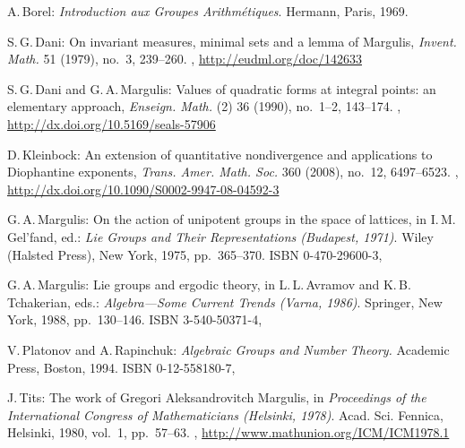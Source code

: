 \begin{references}{9}

A.\,Borel:
\emph{Introduction aux Groupes Arithm\'etiques}.
Hermann, Paris, 1969.
 
S.\,G.\,Dani:
 On invariant measures, minimal sets and a lemma of Margulis,
 \emph{Invent. Math.} 51 (1979), no.~3, 239--260.
 ,
 \maynewline 
 \url{http://eudml.org/doc/142633}
 
S.\,G.\,Dani and G.\,A.\,Margulis:
Values of quadratic forms at integral points: an elementary approach,
\emph{Enseign. Math.} (2) 36 (1990), no.~1--2, 143--174. 
,
\maynewline
\url{http://dx.doi.org/10.5169/seals-57906}

D.\,Kleinbock:
An extension of quantitative nondivergence and applications to Diophantine exponents,
\emph{Trans. Amer. Math. Soc.} 360 (2008), no.~12, 6497--6523. 
,
\maynewline
\url{http://dx.doi.org/10.1090/S0002-9947-08-04592-3}

G.\,A.\,Margulis:
On the action of unipotent groups in the space of lattices, 
in
I.\,M.\,Gel'fand, ed.:
\emph{Lie Groups and Their Representations (Budapest, 1971)}.
 Wiley (Halsted Press), New York, 1975, pp.~365--370.
 ISBN 0-470-29600-3,

G.\,A.\,Margulis:
Lie groups and ergodic theory,
in
L.\,L.\,Avramov and K.\,B.\,Tchakerian, eds.:
 \emph{Algebra---Some Current Trends (Varna, 1986)}.
Springer, New York, 1988, pp.~130--146. 
ISBN 3-540-50371-4,

 V.\,Platonov and A.\,Rapinchuk: 
 \emph{Algebraic Groups and Number Theory.}
 Academic Press, Boston, 1994.
 ISBN 0-12-558180-7,

J.\,Tits:
The work of Gregori Aleksandrovitch Margulis,
in
\emph{Proceedings of the International Congress of Mathematicians (Helsinki, 1978)}.
Acad. Sci. Fennica, Helsinki, 1980, vol.~1, pp.~57--63.
,
\url{http://www.mathunion.org/ICM/ICM1978.1}

\end{references}
